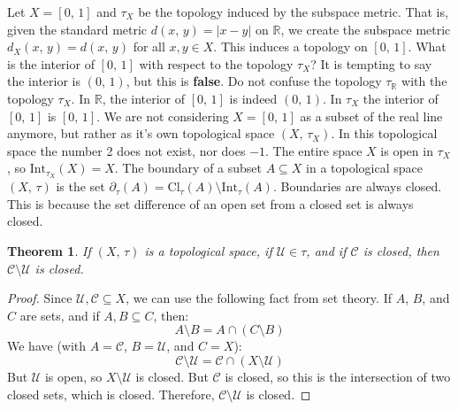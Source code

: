 \documentclass{article}
\theoremstyle{plain}
\newtheorem{theorem}{Theorem}[section]
\theoremstyle{normal}
\newenvironment{example}{%
    \pushQED{\qed}\renewcommand{\qedsymbol}{$\blacksquare$}\examplex%
}{%
    \popQED\endexamplex%
}
\newenvironment{definition}{%
    \pushQED{\qed}\renewcommand{\qedsymbol}{$\blacksquare$}\definitionx%
}{%
    \popQED\enddefinitionx%
}
\begin{document}
        \begin{example}
            Let $X=[0,\,1]$ and $\tau_{X}$ be the topology induced by the
            subspace metric. That is, given the standard metric
            $d(x,\,y)=|x-y|$ on $\mathbb{R}$, we create the subspace metric
            $d_{X}(x,\,y)=d(x,\,y)$ for all $x,y\in{X}$. This induces a topology
            on $[0,\,1]$. What is the interior of $[0,\,1]$ with respect
            to the topology $\tau_{X}$? It is tempting to say the interior
            is $(0,\,1)$, but this is \textbf{false}. Do not confuse the
            topology $\tau_{\mathbb{R}}$ with the topology
            $\tau_{X}$. In $\mathbb{R}$, the interior of $[0,\,1]$ is indeed
            $(0,\,1)$. In $\tau_{X}$ the interior of $[0,\,1]$ is
            $[0,\,1]$. We are not considering $X=[0,\,1]$ as a subset of the
            real line anymore, but rather as it's own topological space
            $(X,\,\tau_{X})$. In this topological space the number 2 does not
            exist, nor does $-1$. The entire space $X$ is open in $\tau_{X}$,
            so $\textrm{Int}_{\tau_{X}}(X)=X$.
        \end{example}
        \begin{definition}[\textbf{Topological Boundary}]
            The boundary of a subset $A\subseteq{X}$ in a topological space
            $(X,\,\tau)$ is the set
            $\partial_{\tau}(A)=\textrm{Cl}_{\tau}(A)\setminus\textrm{Int}_{\tau}(A)$.
        \end{definition}
        Boundaries are always closed. This is because the set difference of an
        open set from a closed set is always closed.
        \begin{theorem}
            If $(X,\,\tau)$ is a topological space, if $\mathcal{U}\in\tau$,
            and if $\mathcal{C}$ is closed, then
            $\mathcal{C}\setminus\mathcal{U}$ is closed.
        \end{theorem}
        \begin{proof}
            Since $\mathcal{U},\mathcal{C}\subseteq{X}$, we can use the
            following fact from set theory. If $A$, $B$, and $C$ are sets,
            and if $A,B\subseteq{C}$, then:
            \begin{equation}
                A\setminus{B}=A\cap(C\setminus{B})
            \end{equation}
            We have (with $A=\mathcal{C}$, $B=\mathcal{U}$, and
            $C=X$):
            \begin{equation}
                \mathcal{C}\setminus\mathcal{U}
                =\mathcal{C}\cap(X\setminus\mathcal{U})
            \end{equation}
            But $\mathcal{U}$ is open, so $X\setminus\mathcal{U}$ is closed.
            But $\mathcal{C}$ is closed, so this is the intersection of two
            closed sets, which is closed. Therefore,
            $\mathcal{C}\setminus\mathcal{U}$ is closed.
        \end{proof}
\end{document}
